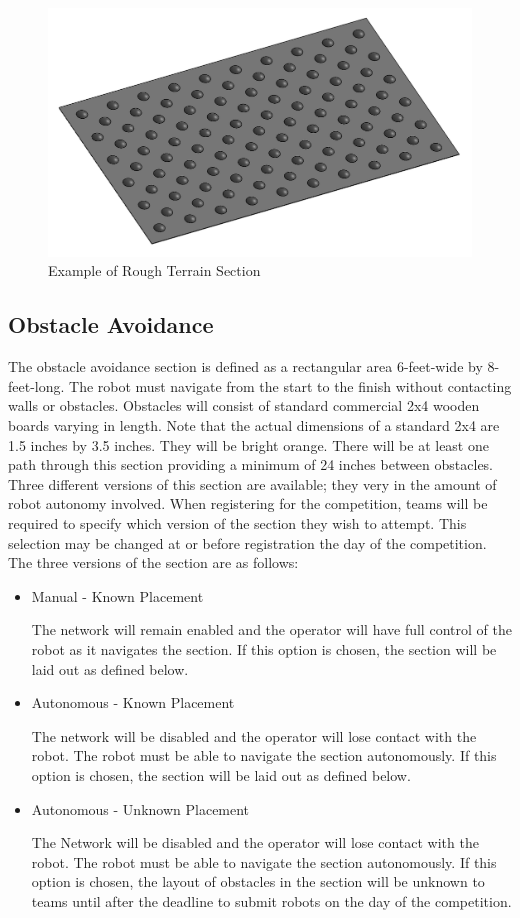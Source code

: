 \begin{figure}[H]
	\centering
	\includegraphics[width=.85\textwidth]{images/rough_terrain.png}
	\caption{Example of Rough Terrain Section}
	\label{fig:rough_terrain} 
\end{figure}

\subsection{Obstacle Avoidance}
The obstacle avoidance section is defined as a rectangular area 6-feet-wide by 8-feet-long. The robot must navigate from the start to the finish without contacting walls or obstacles. Obstacles will consist of standard commercial 2x4 wooden boards varying in length. Note that the actual dimensions of a standard 2x4 are 1.5 inches by 3.5 inches. They will be bright orange. There will be at least one path through this section providing a minimum of 24 inches between obstacles. Three different versions of this section are available; they very in the amount of robot autonomy involved. When registering for the competition, teams will be required to specify which version of the section they wish to attempt. This selection may be changed at or before registration the day of the competition. The three versions of the section are as follows:

\begin{itemize}
    \item Manual - Known Placement
    
        The network will remain enabled and the operator will have full control of the robot as it navigates the section. If this option is chosen, the section will be laid out as defined below.
    \item Autonomous - Known Placement
    
        The network will be disabled and the operator will lose contact with the robot. The robot must be able to navigate the section autonomously. If this option is chosen, the section will be laid out as defined below.
    \item Autonomous - Unknown Placement
    
        The Network will be disabled and the operator will lose contact with the robot. The robot must be able to navigate the section autonomously. If this option is chosen, the layout of obstacles in the section will be unknown to teams until after the deadline to submit robots on the day of the competition. 
        
\end{itemize}

